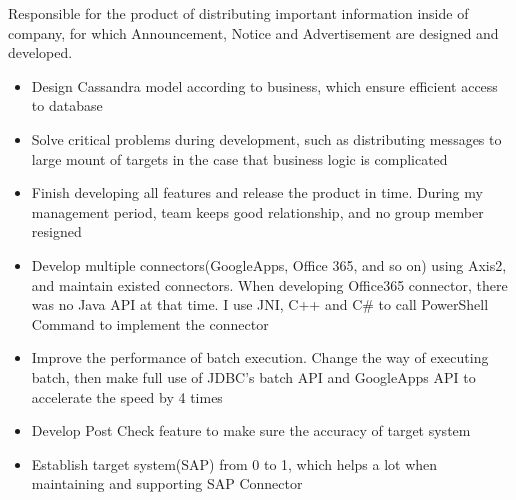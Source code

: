 \documentclass{resume}
\begin{document}

Responsible for the product of distributing important information inside of company, for which Announcement, Notice and Advertisement are designed and developed.
\begin{itemize}
  \item Design Cassandra model according to business, which ensure efficient access to database
  \item Solve critical problems during development, such as distributing messages to large mount of targets in the case that business logic is complicated
  \item Finish developing all features and release the product in time. During my management period, team keeps good relationship, and no group member resigned
\end{itemize}


\begin{itemize}
  \item Develop multiple connectors(GoogleApps, Office 365, and so on) using Axis2, and maintain existed connectors. When developing Office365 connector, there was no Java API at that time. I use JNI, C++ and C\# to call PowerShell Command to implement the connector
  \item Improve the performance of batch execution. Change the way of executing batch, then make full use of JDBC's batch API and  GoogleApps API to accelerate the speed by 4 times
  \item Develop Post Check feature to make sure the accuracy of target system
  \item Establish target system(SAP) from 0 to 1, which helps a lot when maintaining and supporting SAP Connector
\end{itemize}



%
%
\end{document}
